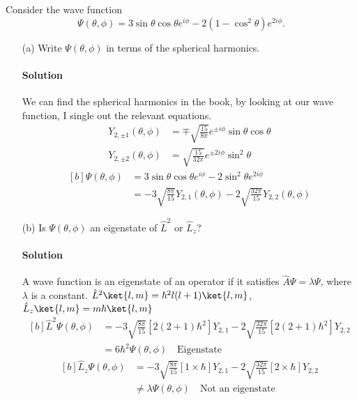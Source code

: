 \documentclass{article}
\begin{document}
	Consider the wave function
	\begin{equation} \label{eq:1}
		\Psi(\theta, \phi) = 3\sin \theta \cos \theta e^{i\phi} - 2\left( 1 - \cos^2 \theta \right) e^{2i\phi}. 
	\end{equation}
	\begin{enumerate}
		\item[(a)] Write $\Psi(\theta, \phi)$ in terms of the spherical harmonics.
		\paragraph{Solution} We can find the spherical harmonics in the book, by looking at our wave function, I single out the relevant equations. 
		\begin{align}
			Y_{2,\pm1} (\theta, \phi) &= \mp \sqrt{\frac{15}{8\pi}} e^{\pm i\phi} \sin \theta \cos \theta \\
			Y_{2,\pm2} (\theta, \phi) &= \sqrt{\frac{15}{32\pi}} e^{\pm 2i\phi} \sin^2 \theta
		\end{align}
		\begin{equation}
			\begin{aligned}[b]
				\Psi(\theta, \phi) &= 3\sin \theta \cos \theta e^{i\phi} - 2\sin^2 \theta e^{2i\phi} \\
								   &= \boxed{-3 \sqrt{\frac{8\pi}{15}} Y_{2,1} (\theta, \phi) - 2 \sqrt{\frac{32\pi}{15}} Y_{2,2} (\theta, \phi)}
			\end{aligned}
		\end{equation}
		
		\item[(b)] Is $\Psi(\theta, \phi)$ an eigenstate of $\hat{L}^2$ or $\hat{L}_z$?
		\paragraph{Solution} A wave function is an eigenstate of an operator if it satisfies $\hat{A} \Psi = \lambda \Psi$, where $\lambda$ is a constant. $\hat{L}^2\ket{l,m} = \hbar^2 l(l+1)\ket{l,m}$, $\hat{L}_z\ket{l,m} = m\hbar\ket{l,m}$ 
		\begin{equation}
			\begin{aligned}[b]
				\hat{L}^2 \Psi(\theta, \phi) &= -3 \sqrt{\frac{8\pi}{15}} \left[ 2(2+1)\hbar^2 \right] Y_{2,1} - 2 \sqrt{\frac{32\pi}{15}} \left[ 2(2+1)\hbar^2 \right] Y_{2,2} \\
											 &= 6\hbar^2 \Psi(\theta,\phi) \quad \boxed{\text{Eigenstate}}
			\end{aligned}
		\end{equation}
		\begin{equation}
			\begin{aligned}[b]
				\hat{L}_z \Psi(\theta, \phi) &= -3 \sqrt{\frac{8\pi}{15}} \left[ 1 \times \hbar \right] Y_{2,1} - 2 \sqrt{\frac{32\pi}{15}} \left[ 2 \times \hbar \right] Y_{2,2} \\
										   	 &\neq \lambda \Psi(\theta,\phi) \quad \boxed{\text{Not an eigenstate}}
			\end{aligned}
		\end{equation}
		

\end{enumerate}
\end{document}
